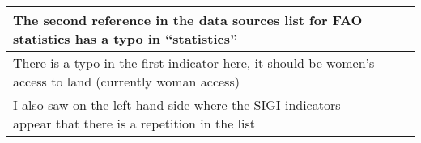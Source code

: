 \begin{longtable}[c]{|p{60mm}|p{20mm}|p{50mm}|}
	\hline
	The second reference in the data sources list for FAO statistics has a typo in ``statistics'' & & \\
	\hline
	There is a typo in the first indicator here, it should be women's access to land (currently woman access) & & \\
	\hline
	I also saw on the left hand side where the SIGI indicators appear that there is a repetition in the list & &\\
	\hline
	\hline
\end{longtable}

